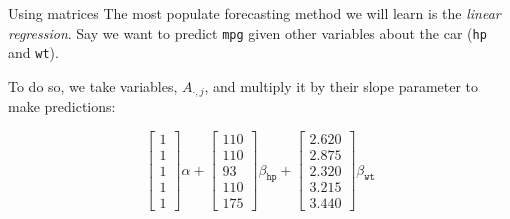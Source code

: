 \documentclass[aspectratio=169,t,11pt,table]{beamer}
\begin{document}
\begin{frame}{Using matrices}
  The most populate forecasting method we will learn is the \emph{linear regression}. Say we want to predict \texttt{mpg} given other variables about the car (\texttt{hp} and \texttt{wt}). 
  
  \pause
  \bigskip
  To do so, we take variables, $A_{\cdot, j}$, and multiply it by their slope parameter to make predictions:

  $$
    \begin{bmatrix}1 \\ 1 \\ 1 \\ 1 \\ 1\end{bmatrix} \alpha + 
    \begin{bmatrix}110 \\ 110 \\ 93 \\ 110 \\ 175\end{bmatrix} \beta_{\texttt{hp}} + 
    \begin{bmatrix}2.620 \\ 2.875 \\ 2.320 \\ 3.215 \\ 3.440\end{bmatrix} \beta_{\texttt{wt}}
  $$
\end{frame}
\end{document}
